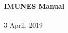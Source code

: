 \begin{titlepage}
\begin{mytitle}
\begin{center}

\HRule \\[0.7cm]
{\huge\bfseries IMUNES Manual}\\[0.4cm] 

\HRule \\[1.5cm]

{\Large 3 April, 2019}
 
\end{center}
\end{mytitle}
\end{titlepage}
